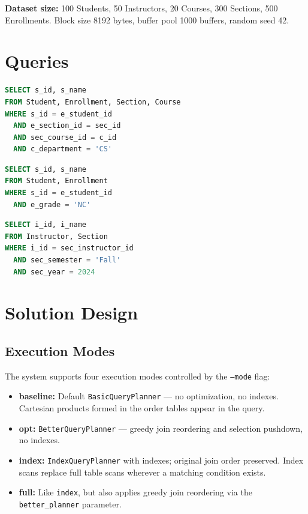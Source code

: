 \documentclass[12pt,a4paper]{article}
\begin{document}
\noindent\textbf{Dataset size:} 100 Students, 50 Instructors, 20 Courses, 300 Sections, 500 Enrollments. Block size 8192 bytes, buffer pool 1000 buffers, random seed 42.

\section{Queries}

\begin{lstlisting}[style=sqlstyle,language=SQL,caption={Q1 -- Students enrolled in CS courses}]
SELECT s_id, s_name
FROM Student, Enrollment, Section, Course
WHERE s_id = e_student_id
  AND e_section_id = sec_id
  AND sec_course_id = c_id
  AND c_department = 'CS'
\end{lstlisting}

\begin{lstlisting}[style=sqlstyle,language=SQL,caption={Q2 -- Students with grade NC}]
SELECT s_id, s_name
FROM Student, Enrollment
WHERE s_id = e_student_id
  AND e_grade = 'NC'
\end{lstlisting}

\begin{lstlisting}[style=sqlstyle,language=SQL,caption={Q3 -- Instructors teaching Fall 2024}]
SELECT i_id, i_name
FROM Instructor, Section
WHERE i_id = sec_instructor_id
  AND sec_semester = 'Fall'
  AND sec_year = 2024
\end{lstlisting}

\section{Solution Design}

\subsection{Execution Modes}

The system supports four execution modes controlled by the \texttt{--mode} flag:

\begin{itemize}[nosep]
  \item \textbf{baseline:} Default \texttt{BasicQueryPlanner} — no optimization, no indexes.
        Cartesian products formed in the order tables appear in the query.
  \item \textbf{opt:} \texttt{BetterQueryPlanner} — greedy join reordering and selection
        pushdown, no indexes.
  \item \textbf{index:} \texttt{IndexQueryPlanner} with indexes; original join order
        preserved. Index scans replace full table scans wherever a matching condition exists.
  \item \textbf{full:} Like \texttt{index}, but also applies greedy join reordering
        via the \texttt{better\_planner} parameter.
\end{itemize}
\end{document}
